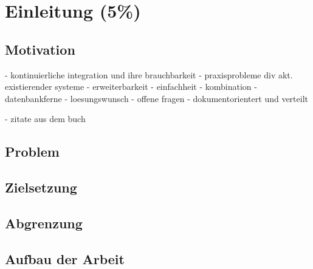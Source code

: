 \chapter{Einleitung (5\%) }

\section{Motivation}

- kontinuierliche integration und ihre brauchbarkeit
- praxisprobleme div akt. existierender systeme
  - erweiterbarkeit
  - einfachheit
  - kombination
- datenbankferne
- loesungswunsch
    - offene fragen
- dokumentorientert und verteilt


- zitate aus dem buch



\section{Problem}


\section{Zielsetzung}


\section{Abgrenzung}


\section{Aufbau der Arbeit}


